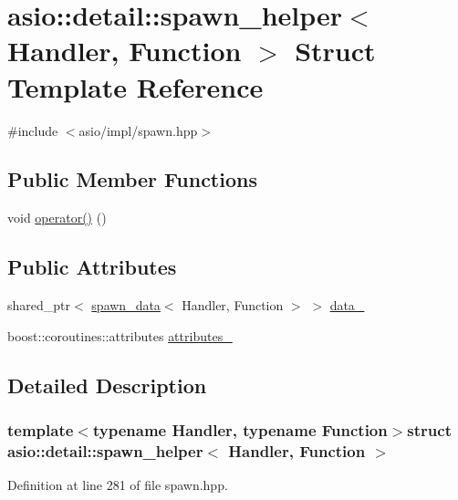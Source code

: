 \hypertarget{structasio_1_1detail_1_1spawn__helper}{}\section{asio\+:\+:detail\+:\+:spawn\+\_\+helper$<$ Handler, Function $>$ Struct Template Reference}
\label{structasio_1_1detail_1_1spawn__helper}


{\ttfamily \#include $<$asio/impl/spawn.\+hpp$>$}

\subsection*{Public Member Functions}
\begin{DoxyCompactItemize}
\item 
void \hyperlink{structasio_1_1detail_1_1spawn__helper_abd7a1422d0791a717b944f06980addaf}{operator()} ()
\end{DoxyCompactItemize}
\subsection*{Public Attributes}
\begin{DoxyCompactItemize}
\item 
shared\+\_\+ptr$<$ \hyperlink{structasio_1_1detail_1_1spawn__data}{spawn\+\_\+data}$<$ Handler, Function $>$ $>$ \hyperlink{structasio_1_1detail_1_1spawn__helper_a9905b71df2ab1fad3d13f9396d72506d}{data\+\_\+}
\item 
boost\+::coroutines\+::attributes \hyperlink{structasio_1_1detail_1_1spawn__helper_af369e4458578177e3961510b61e968fe}{attributes\+\_\+}
\end{DoxyCompactItemize}


\subsection{Detailed Description}
\subsubsection*{template$<$typename Handler, typename Function$>$struct asio\+::detail\+::spawn\+\_\+helper$<$ Handler, Function $>$}



Definition at line 281 of file spawn.\+hpp.



